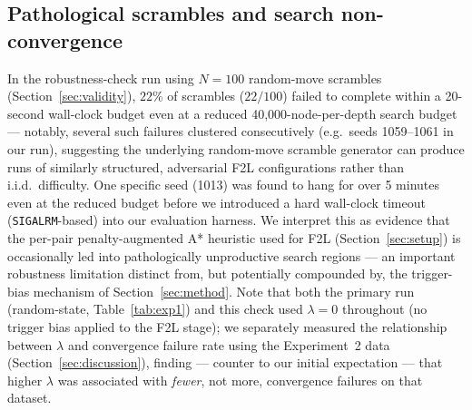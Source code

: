 \documentclass[10pt,conference]{article}
\begin{document}
\subsection{Pathological scrambles and search non-convergence}
\label{sec:pathological}
In the robustness-check run using $N=100$ random-move scrambles
(Section~\ref{sec:validity}), $22\%$ of scrambles ($22/100$) failed to
complete within a 20-second wall-clock budget even at a reduced
40{,}000-node-per-depth search budget --- notably, several such
failures clustered consecutively (e.g.\ seeds 1059--1061 in our
run), suggesting the underlying random-move scramble generator can
produce runs of similarly structured, adversarial F2L configurations
rather than i.i.d.\ difficulty. One specific seed (1013) was found
to hang for over 5 minutes even at the reduced budget before we
introduced a hard wall-clock timeout (\texttt{SIGALRM}-based) into
our evaluation harness. We interpret this as evidence that the
per-pair penalty-augmented A* heuristic used for F2L
(Section~\ref{sec:setup}) is occasionally led into pathologically
unproductive search regions --- an important robustness limitation
distinct from, but potentially compounded by, the trigger-bias
mechanism of Section~\ref{sec:method}. Note that both the primary run
(random-state, Table~\ref{tab:exp1}) and this check used $\lambda=0$
throughout (no trigger bias applied to the F2L stage); we separately
measured the relationship between $\lambda$ and convergence failure
rate using the Experiment~2 data (Section~\ref{sec:discussion}),
finding --- counter to our initial expectation --- that higher
$\lambda$ was associated with \emph{fewer}, not more, convergence
failures on that dataset.

\end{document}
